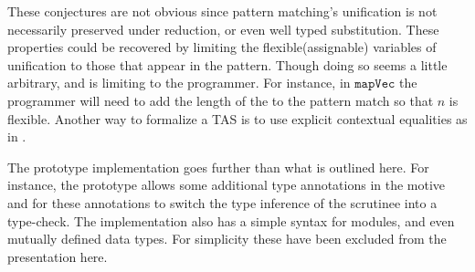 These conjectures are not obvious since pattern matching's unification is not necessarily preserved under reduction, or even well typed substitution.
These properties could be recovered by limiting the flexible(assignable) variables of unification to those that appear in the pattern.
Though doing so seems a little arbitrary, and is limiting to the programmer.
For instance, in $\mathtt{mapVec}$ the programmer will need to add the length of the \Vect{} to the pattern match so that $n$ is flexible.
Another way to formalize a \ac{TAS} is to use explicit contextual equalities as in \cite{sjoberg2015dependently}.
 
The prototype implementation goes further than what is outlined here.
For instance, the prototype allows some additional type annotations in the motive and for these annotations to switch the type inference of the scrutinee into a type-check.
The implementation also has a simple syntax for modules, and even mutually defined data types.
For simplicity these have been excluded from the presentation here.